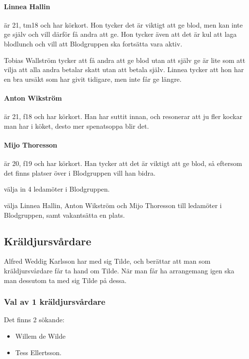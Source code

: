\documentclass[hidelinks]{sektionsmote}
\begin{document}
\paragraph{Linnea Hallin} är 21, tm18 och har körkort.
Hon tycker det är viktigt att ge blod, men kan inte ge själv och vill därför få andra att ge.
Hon tycker även att det är kul att laga blodlunch och vill att Blodgruppen ska fortsätta vara aktiv.

Tobias Wallström tycker att få andra att ge blod utan att själv ge är lite som att vilja att alla andra betalar skatt utan att betala själv.
Linnea tycker att hon har en bra ursäkt som har givit tidigare, men inte får ge längre.

\paragraph{Anton Wikström} är 21, f18 och har körkort.
Han har suttit innan, och resonerar att ju fler kockar man har i köket, desto mer spenatsoppa blir det.

\paragraph{Mijo Thoresson} är 20, f19 och har körkort.
Han tycker att det är viktigt att ge blod, så eftersom det finns platser över i Blodgruppen vill han bidra.

\begin{beslut}
  \item välja in 4 ledamöter i Blodgruppen.
  \item välja Linnea Hallin, Anton Wikström och Mijo Thoresson till ledamöter i Blodgruppen, samt vakantsätta en plats.
\end{beslut}


\subsection{Kräldjursvårdare}
Alfred Weddig Karlsson har med sig Tilde, och berättar att man som kräldjursvårdare får ta hand om Tilde.
När man får ha arrangemang igen ska man dessutom ta med sig Tilde på dessa.

\subsubsection{Val av 1 kräldjursvårdare}
Det finns 2 sökande:
\begin{itemize}
    \item Willem de Wilde
    \item Tess Ellertsson.
\end{itemize}
\end{document}
